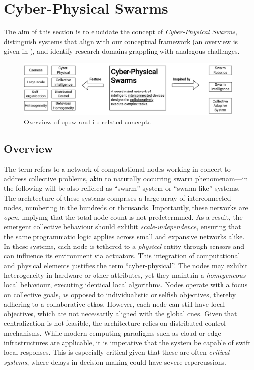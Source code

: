 \chapter{Cyber-Physical Swarms}\label{chap:cpsw}
\minitoc%
The aim of this section is to elucidate the concept of \textit{Cyber-Physical Swarms}, 
 distinguish systems that align with our conceptual framework (an overview is given in ), 
 and identify research domains grappling with analogous challenges. 
% 
\begin{figure}
    \includegraphics[width=\textwidth]{chapters/img/cyber-physical-swarms-overview.drawio.pdf}
    \caption{Overview of \acf{cpsw} and its related concepts}\label{fig:overview-cpsw}
\end{figure}
\section{Overview}
The term refers to a network of computational nodes working in concert to address collective problems, 
 akin to naturally occurring swarm phenomenam---in the following will be also reffered as ``swarm'' system or ``swarm-like'' systems.
%
The architecture of these systems comprises a large array of interconnected nodes, 
 numbering in the hundreds or thousands. 
% 
Importantly, these networks are \textit{open}, 
 implying that the total node count is not predetermined. 
% 
As a result, 
 the emergent collective behaviour should exhibit \textit{scale-independence}, 
 ensuring that the same programmatic logic applies across small and expansive networks alike.
%
In these systems, each node is tethered to a \textit{physical} entity through sensors and can influence its environment via actuators. 
 This integration of computational and physical elements justifies the term ``cyber-physical''. 
 The nodes may exhibit heterogeneity in hardware or other attributes, 
 yet they maintain a \emph{homogeneous} local behaviour, executing identical local algorithms.
%
Nodes operate with a focus on collective goals, 
 as opposed to individualistic or selfish objectives, 
 thereby adhering to a collaborative ethos.
%
However, each node can still have local objectives, 
 which are not necessarily aligned with the global ones.
% 
Given that centralization is not feasible, 
 the architecture relies on distributed control mechanisms. 
 While modern computing paradigms such as cloud or edge infrastructures are applicable, 
 it is imperative that the system be capable of swift local responses. 
 This is especially critical given that these are often \emph{critical systems}, 
 where delays in decision-making could have severe repercussions.

